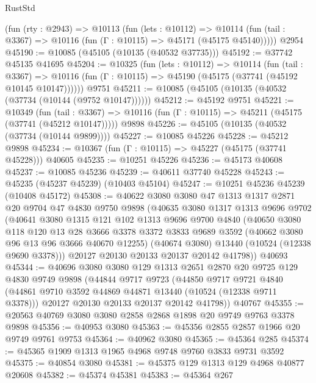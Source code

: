 \begin{lexlean}{RustStd}
\begin{coremodule}
    (fun (rty : @2943) =>
    @10113
      (fun (lets : @10112) =>
      @10114 (fun (tail : @3367) => @10116 (fun (Γ : @10115) => @45171 (@45175 @45140)))))
    @2954
@45190 := @10085 (@45105 (@10135 (@40532 @37735)))
@45192 := @37742 @45135 @41695
@45204 := @10325
    (fun (lets : @10112) =>
    @10114
      (fun (tail : @3367) =>
      @10116 (fun (Γ : @10115) => @45190 (@45175 (@37741 (@45192 @10145 @10147))))))
    @9751
@45211 := @10085 (@45105 (@10135 (@40532 (@37734 (@10144 (@9752 @10147))))))
@45212 := @45192 @9751
@45221 := @10349
    (fun (tail : @3367) => @10116 (fun (Γ : @10115) => @45211 (@45175 (@37741 (@45212 @10147)))))
    @9898
@45226 := @45105 (@10135 (@40532 (@37734 (@10144 @9899))))
@45227 := @10085 @45226
@45228 := @45212 @9898
@45234 := @10367 (fun (Γ : @10115) => @45227 (@45175 (@37741 @45228))) @40605
@45235 := @10251 @45226
@45236 := @45173 @40608
@45237 := @10085 @45236
@45239 := @40611 @37740 @45228
@45243 := @45235 (@45237 @45239) (@10403 @45104)
@45247 := @10251 @45236 @45239 (@10408 @45172)
@45308 := @40622
    @3080
    @3080
    @47
    @1313
    @1317
    @2871
    @20
    @9704
    @47
    @4830
    @9750
    @9898
    (@40635
      @3080
      @1317
      @1313
      @9696
      @9702
      (@40641
        @3080
        @1315
        @121
        @102
        @1313
        @9696
        @9700
        @4840
        (@40650
          @3080
          @118
          @120
          @13
          @28
          @3666
          @3378
          @3372
          @3833
          @9689
          @3592
          (@40662 @3080 @96 @13 @96 @3666 @40670 @12255)
          (@40674 @3080)
          @13440
          (@10524 (@12338 @9690 @3378)))
        @20127
        @20130
        @20133
        @20137
        @20142
        @41798))
    @40693
@45344 := @40696
    @3080
    @3080
    @129
    @1313
    @2651
    @2870
    @20
    @9725
    @129
    @4830
    @9749
    @9898
    (@44844
      @9717
      @9723
      (@44850
        @9717
        @9721
        @4840
        (@44861 @9710 @3592 @44869 @44871 @13440 (@10524 (@12338 @9711 @3378)))
        @20127
        @20130
        @20133
        @20137
        @20142
        @41798))
    @40767
@45355 := @20563 @40769 @3080 @3080 @2858 @2868 @1898 @20 @9749 @9763 @3378 @9898
@45356 := @40953 @3080
@45363 := @45356 @2855 @2857 @1966 @20 @9749 @9761 @9753
@45364 := @40962 @3080
@45365 := @45364 @285
@45374 := @45365 @1909 @1313 @1965 @4968 @9748 @9760 @3833 @9731 @3592
@45375 := @40854 @3080
@45381 := @45375 @129 @1313 @129 @4968 @40877 @20608
@45382 := @45374 @45381
@45383 := @45364 @267

\end{coremodule}
\end{lexlean}
